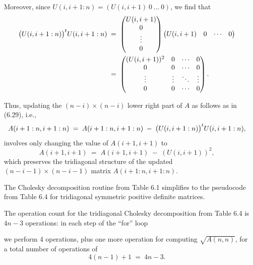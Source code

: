 Moreover, since $U(i,i+1:n) = (U(i,i+1)\ 0\ \ldots\ 0)$, we find that
\[
\begin{aligned}
\big(U(i,i+1:n)\big)^{t} U(i,i+1:n)
&\;=\;
\begin{pmatrix} U(i,i+1) \\ 0 \\ \vdots \\ 0 \end{pmatrix}
\begin{pmatrix} U(i,i+1) & 0 & \cdots & 0 \end{pmatrix} \\
&\;=\;
\begin{pmatrix}
(U(i,i+1))^2 & 0 & \cdots & 0 \\
0 & 0 & \cdots & 0 \\
\vdots & \vdots & \ddots & \vdots \\
0 & 0 & \cdots & 0
\end{pmatrix}.
\end{aligned}
\]

Thus, updating the $(n-i) \times (n-i)$ lower right part of $A$ as follows as in (6.29),
i.e.,
\[
A(i+1:n,i+1:n) \;=\; A(i+1:n,i+1:n) \;-\; \big(U(i,i+1:n)\big)^{t} U(i,i+1:n),
\]
involves only changing the value of $A(i+1,i+1)$ to
\[
A(i+1,i+1) \;=\; A(i+1,i+1) \;-\; (U(i,i+1))^2,
\]
which preserves the tridiagonal structure of the updated $(n-i-1) \times (n-i-1)$
matrix $A(i+1:n,i+1:n)$.

The Cholesky decomposition routine from Table 6.1 simplifies to the pseudocode from
Table 6.4 for tridiagonal symmetric positive definite matrices.

The operation count for the tridiagonal Cholesky decomposition from Table 6.4 is $4n-3$
operations: in each step of the ``for'' loop

\begin{center}
\end{center}

we perform 4 operations, plus one more operation for computing $\sqrt{A(n,n)}$, for a
total number of operations of
\begin{equation}
4(n-1) + 1 \;=\; 4n - 3.
\end{equation}
